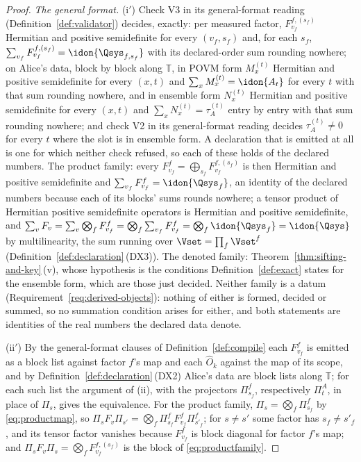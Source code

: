 \begin{proof}
\emph{The general format.} (i$'$) Check V3 in its general-format reading
(Definition~\ref{def:validator}) decides, exactly: per measured factor,
$F^{f,(s_f)}_{v_f}$ Hermitian and positive semidefinite for every
$(v_f,s_f)$ and, for each $s_f$,
$\sum_{v_f}F^{f,(s_f)}_{v_f}=\idon{\Qsys_{f,s_f}}$ with its declared-order sum
rounding nowhere; on Alice's data, block by block along $\mathbb{T}$, in POVM
form $M^{(t)}_x$ Hermitian and positive semidefinite for every $(x,t)$ and
$\sum_xM^{(t)}_x=\idon{A_t}$ for every $t$ with that sum rounding nowhere,
and in ensemble form $N^{(t)}_x$ Hermitian and positive semidefinite for
every $(x,t)$ and $\sum_xN^{(t)}_x=\tau^{(t)}_A$ entry by entry with that sum
rounding nowhere; and check V2 in its general-format reading decides
$\tau^{(t)}_A\ne0$ for every $t$ where the slot is in ensemble form. A
declaration that is emitted at all is one for which neither check refused, so
each of these holds of the declared numbers. The product family: every
$F^{f}_{v_f}=\bigoplus_{s_f}F^{f,(s_f)}_{v_f}$ is then Hermitian and positive
semidefinite and $\sum_{v_f}F^{f}_{v_f}=\idon{\Qsys_f}$, an identity of the
declared numbers because each of its blocks' sums rounds nowhere; a tensor
product of Hermitian positive semidefinite operators is Hermitian and
positive semidefinite, and
$\sum_{v}F_v=\sum_{v}\bigotimes_fF^{f}_{v_f}=\bigotimes_f\sum_{v_f}F^{f}_{v_f}
=\bigotimes_f\idon{\Qsys_f}=\idon{\Qsys}$ by multilinearity, the sum running
over $\Vset=\prod_f\Vset^{f}$ (Definition~\ref{def:declaration}\,(DX3)). The
denoted family: Theorem~\ref{thm:sifting-and-key}\,(v), whose hypothesis is the
conditions Definition~\ref{def:exact} states for the ensemble form, which are
those just decided. Neither family is a datum
(Requirement~\ref{req:derived-objects}): nothing of either is formed, decided
or summed, so no summation condition arises for either, and both statements
are identities of the real numbers the declared data denote.

(ii$'$) By the general-format clauses of Definition~\ref{def:compile} each
$F^{f}_{v_f}$ is emitted as a block list against factor $f$'s map and each
$\hat O_k$ against the map of its scope, and by
Definition~\ref{def:declaration}\,(DX2) Alice's data are block lists along
$\mathbb{T}$; for each such list the argument of (ii), with the projectors
$\Pi^{f}_{s_f}$, respectively $\Pi^{A}_t$, in place of $\Pi_s$, gives the
equivalence. For the product family, $\Pi_s=\bigotimes_f\Pi^{f}_{s_f}$ by
\eqref{eq:productmap}, so
$\Pi_sF_v\Pi_{s'}=\bigotimes_f\Pi^{f}_{s_f}F^{f}_{v_f}\Pi^{f}_{s'_f}$; for
$s\ne s'$ some factor has $s_f\ne s'_f$, and its tensor factor vanishes because
$F^{f}_{v_f}$ is block diagonal for factor $f$'s map; and
$\Pi_sF_v\Pi_s=\bigotimes_fF^{f,(s_f)}_{v_f}$ is the block of
\eqref{eq:productfamily}.


\end{proof}
